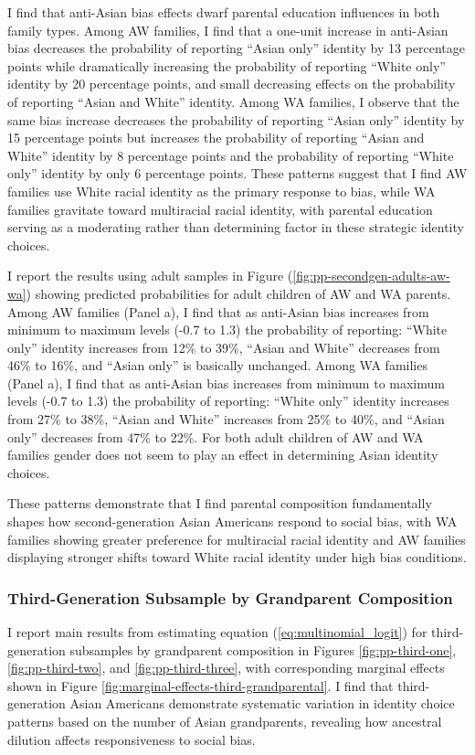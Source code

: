 I find that anti-Asian bias effects dwarf parental education influences in both family types. Among AW families, I find that a one-unit increase in anti-Asian bias decreases the probability of reporting ``Asian only'' identity by 13 percentage points while dramatically increasing the probability of reporting ``White only'' identity by 20 percentage points, and small decreasing effects on the probability of reporting ``Asian and White'' identity. Among WA families, I observe that the same bias increase decreases the probability of reporting ``Asian only'' identity by 15 percentage points but increases the probability of reporting ``Asian and White'' identity by 8 percentage points and the probability of reporting ``White only'' identity by only 6 percentage points. These patterns suggest that I find AW families use White racial identity as the primary response to bias, while WA families gravitate toward multiracial racial identity, with parental education serving as a moderating rather than determining factor in these strategic identity choices.

I report the results using adult samples in Figure (\ref{fig:pp-secondgen-adults-aw-wa}) showing predicted probabilities for adult children of AW and WA parents. Among AW families (Panel a), I find that as anti-Asian bias increases from minimum to maximum levels (-0.7 to 1.3) the probability of reporting: ``White only'' identity increases from 12\% to 39\%, ``Asian and White'' decreases from 46\% to 16\%, and ``Asian only'' is basically unchanged. Among WA families (Panel a), I find that as anti-Asian bias increases from minimum to maximum levels (-0.7 to 1.3) the probability of reporting: ``White only'' identity increases from 27\% to 38\%, ``Asian and White'' increases from 25\% to 40\%, and ``Asian only'' decreases from 47\% to 22\%. For both adult children of AW and WA families gender does not seem to play an effect in determining Asian identity choices.


These patterns demonstrate that I find parental composition fundamentally shapes how second-generation Asian Americans respond to social bias, with WA families showing greater preference for multiracial racial identity and AW families displaying stronger shifts toward White racial identity under high bias conditions.

\subsubsection*{Third-Generation Subsample by Grandparent Composition}
I report main results from estimating equation (\ref{eq:multinomial_logit}) for third-generation subsamples by grandparent composition in Figures \ref{fig:pp-third-one}, \ref{fig:pp-third-two}, and \ref{fig:pp-third-three}, with corresponding marginal effects shown in Figure \ref{fig:marginal-effects-third-grandparental}. I find that third-generation Asian Americans demonstrate systematic variation in identity choice patterns based on the number of Asian grandparents, revealing how ancestral dilution affects responsiveness to social bias.

